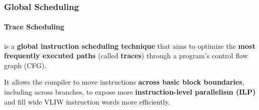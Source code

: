 \subsubsection{Global Scheduling}

\paragraph{Trace Scheduling}\label{paragraph: Trace Scheduling}

 is a \textbf{global instruction scheduling technique} that aims to optimize the \textbf{most frequently executed paths} (called \textbf{traces}) through a program's control flow graph (CFG).

\highspace
It allows the compiler to move instructions \textbf{across basic block boundaries}, including across branches, to expose more \textbf{instruction-level parallelism (ILP)} and fill wide VLIW instruction words more efficiently.
